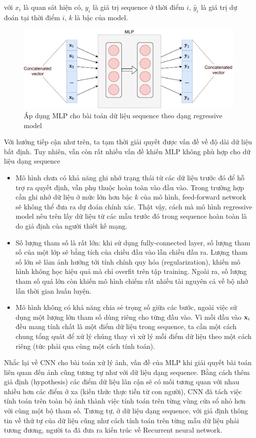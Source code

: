 với $x_i$ là quan sát hiện có, $y_i$ là giá trị sequence ở thời điểm $i$, $\hat{y}_i$ là giá trị dự đoán tại thời điểm $i$, $k$ là bậc của model.
\begin{figure}[h!]
    \centering
    \includegraphics[width=\textwidth,height=\textheight,keepaspectratio]{books/artificial-neural-network/chapter06/figure-sec1/mlp.pdf}
    \caption{Áp dụng MLP cho bài toán dữ liệu sequence theo dạng regressive model}
\end{figure}

Với hướng tiếp cận như trên, ta tạm thời giải quyết được vấn đề về độ dài dữ liệu bất định. Tuy nhiên, vẫn còn rất nhiều vấn đề khiến MLP không phù hợp cho dữ liệu dạng sequence
\begin{itemize}
    \item Mô hình chưa có khả năng ghi nhớ trạng thái từ các dữ liệu trước đó để hỗ trợ ra quyết định, vẫn phụ thuộc hoàn toàn vào đầu vào. Trong trường hợp cần ghi nhớ dữ liệu ở mức lớn hơn bậc $k$ của mô hình, feed-forward network sẽ không thể đưa ra dự đoán chính xác. Thật vậy, cách mà mô hình regressive model nêu trên lấy dữ liệu từ các mẫu trước đó trong sequence hoàn toàn là do giả định của người thiết kế mạng.
    \item Số lượng tham số là rất lớn: khi sử dụng fully-connected layer, số lượng tham số của một lớp sẽ bằng tích của chiều đầu vào lẫn chiều đầu ra. Lượng tham số lớn sẽ làm ảnh hưởng tới tính chính quy hóa (regularization), khiến mô hình không học hiệu quả mà chỉ overfit trên tập training. Ngoài ra, số lượng tham số quá lớn còn khiến mô hình chiếm rất nhiều tài nguyên cả về bộ nhớ lẫn thời gian huấn luyện.
    \item Mô hình không có khả năng chia sẻ trọng số giữa các bước, ngoài việc sử dụng một lượng lớn tham số dùng riêng cho từng đầu vào. Vì mỗi đầu vào $\textbf x_i$ đều mang tính chất là một điểm dữ liệu trong sequence, ta cần một cách chung tổng quát để xử lý chúng thay vì xử lý mỗi điểm dữ liệu theo một cách riêng (tức phải qua cùng một cách tính toán).
\end{itemize}

Nhắc lại về CNN cho bài toán xử lý ảnh, vấn đề của MLP khi giải quyết bài toán liên quan đến ảnh cũng tương tự như với dữ liệu dạng sequence. Bằng cách thêm giả định (hypothesis) các điểm dữ liệu lân cận sẽ có mối tương quan với nhau nhiều hơn các điểm ở xa (kiến thức thực tiễn từ con người), CNN đã tách việc tính toán trên toàn bộ ảnh thành việc tính toán trên từng vùng cửa sổ nhỏ hơn với cùng một bộ tham số. Tương tự, ở dữ liệu dạng sequence, với giả định thông tin về thứ tự của dữ liệu cũng như cách tính toán trên từng mẫu dữ liệu phải tương đương, người ta đã đưa ra kiến trúc về Recurrent neural network.
